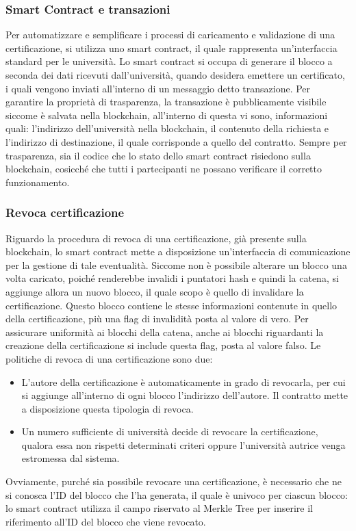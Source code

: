 \documentclass[a4paper,12pt]{article}
\begin{document}
\subsubsection{Smart Contract e transazioni}
Per automatizzare e semplificare i processi di caricamento e validazione di una certificazione, si utilizza uno smart contract, il quale rappresenta un'interfaccia standard per le università. Lo smart contract si occupa di generare il blocco a seconda dei dati ricevuti dall'università, quando desidera emettere un certificato, i quali vengono inviati all'interno di un messaggio detto transazione.
\newline Per garantire la proprietà di trasparenza, la transazione è pubblicamente visibile siccome è salvata nella blockchain, all'interno di questa vi sono, informazioni quali: l'indirizzo dell'università nella blockchain, il contenuto della richiesta e l'indirizzo di destinazione, il quale corrisponde a quello del contratto. 
\newline Sempre per trasparenza, sia il codice che lo stato dello smart contract risiedono sulla blockchain, cosicché che tutti i partecipanti ne possano verificare il corretto funzionamento.
\subsubsection{Revoca certificazione}
Riguardo la procedura di revoca di una certificazione, già presente sulla blockchain, lo smart contract mette a disposizione un'interfaccia di comunicazione per la gestione di tale eventualità.
\newline Siccome non è possibile alterare un blocco una volta caricato, poiché renderebbe invalidi i puntatori hash e quindi la catena, si aggiunge allora un nuovo blocco, il quale scopo è quello di invalidare la certificazione. Questo blocco contiene le stesse informazioni contenute in quello della certificazione, più una flag di invalidità posta al valore di vero.
\newline Per assicurare uniformità ai blocchi della catena, anche ai blocchi riguardanti la creazione della certificazione si include questa flag, posta al valore falso.
\newline Le politiche di revoca di una certificazione sono due: 
\begin{itemize}
    \item L'autore della certificazione è automaticamente in grado di revocarla, per cui si aggiunge all'interno di ogni blocco l'indirizzo dell'autore. Il contratto mette a disposizione questa tipologia di revoca.
    \item Un numero sufficiente di università decide di revocare la certificazione, qualora essa non rispetti determinati criteri oppure l'università autrice venga estromessa dal sistema. 
\end{itemize}
Ovviamente, purché sia possibile revocare una certificazione, è necessario che ne si conosca l'ID del blocco che l'ha generata, il quale è univoco per ciascun blocco: lo smart contract utilizza il campo riservato al Merkle Tree per inserire il riferimento all'ID del blocco che viene revocato.
\end{document}

